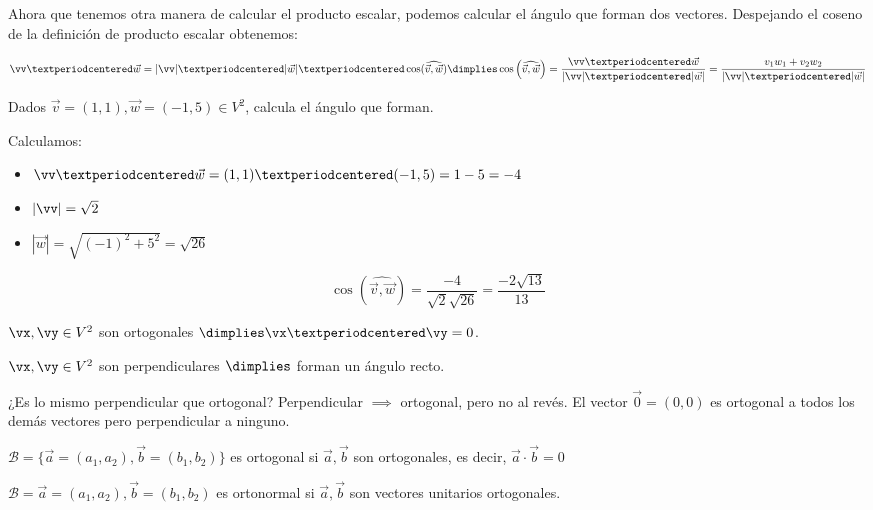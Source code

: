 Ahora que tenemos otra manera de calcular el producto escalar, podemos calcular el ángulo que forman dos vectores. Despejando el coseno de la definición de producto escalar obtenemos:

\[\vv·\vec{w} = |\vv|·|\vec{w}|·\cos(\widehat{\vec{v},\vec{w}})\dimplies\cos\left(\widehat{\vec{v},\vec{w}}\right)=\frac{\vv·\vec{w}}{|\vv|·|\vec{w}|} = \frac{v_1w_1+v_2w_2}{|\vv|·|\vec{w}|}\]



\begin{example}
Dados $\vec{v}=(1,1),\vec{w}=(-1,5) \in V^2$, calcula el ángulo que forman.

Calculamos: 
\begin{itemize}
	\item $\vv·\vec{w} = (1,1)·(-1,5) = 1-5= -4$
	\item $|\vv| = \sqrt{2}$
	\item $|\vec{w}| = \sqrt{(-1)^2+5^2} = \sqrt{26}$
\end{itemize}

\[\cos\left(\widehat{\vec{v},\vec{w}}\right) = \frac{-4}{\sqrt{2}\sqrt{26}} = \frac{-2\sqrt{13}}{13}\]
\end{example}


\begin{defn}[Ortogonalidad]
$\vx,\vy\in V^2$ son ortogonales $\dimplies \vx·\vy=0$.
\end{defn}

\begin{defn}[Perpendicular]
$\vx,\vy\in V^2$ son perpendiculares $\dimplies$ forman un ángulo recto.
\end{defn}

¿Es lo mismo perpendicular que ortogonal? Perpendicular $\implies$ ortogonal, pero no al revés. El vector $\vec{0} = (0,0)$ es ortogonal a todos los demás vectores pero perpendicular a ninguno.


\begin{defn}
$\mathcal{B} = \{\vec{a}=(a_1,a_2),\vec{b}=(b_1,b_2)\}$ es ortogonal si $\vec{a},\vec{b}$ son ortogonales, es decir, $\vec{a}\cdot\vec{b} = 0$ 
\end{defn}

\begin{defn}
$\mathcal{B} = \vec{a}=(a_1,a_2),\vec{b}=(b_1,b_2)$ es ortonormal si $\vec{a},\vec{b}$ son vectores unitarios ortogonales.
\end{defn}



